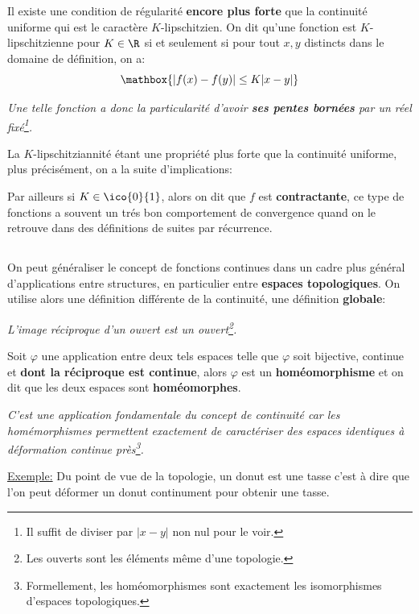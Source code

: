 Il existe une condition de régularité \textbf{encore plus forte} que la continuité uniforme qui est le caractère \(K\)-lipschitzien. On dit qu'une fonction est \(K\)-lipschitzienne pour \(K \in \R\) si et seulement si pour tout \(x, y\) distincts dans le domaine de définition, on a:
\[
   \mathbox{|f(x) - f(y)| \leq K|x - y|}   
\]
\begin{center}
   \textit{
      Une telle fonction a donc la particularité d'avoir \textbf{ses pentes bornées} par un réel fixé\footnote[1]{Il suffit de diviser par \(|x - y|\) non nul pour le voir.}.
   }
\end{center}
La \(K\)-lipschitziannité étant une propriété plus forte que la continuité uniforme, plus précisément, on a la suite d'implications:
\begin{center}
\end{center}
Par ailleurs si \(K \in \ico{0}{1}\), alors on dit que \(f\) est \textbf{contractante}, ce type de fonctions a souvent un trés bon comportement de convergence quand on le retrouve dans des définitions de suites par récurrence.

\subsection*{}

On peut généraliser le concept de fonctions continues dans un cadre plus général d'applications entre structures, en particulier entre \textbf{espaces topologiques}. On utilise alors une définition différente de la continuité, une définition \textbf{globale}:
\begin{center}
   \textit{L'image réciproque d'un ouvert est un ouvert\footnote[2]{Les ouverts sont les éléments même d'une topologie.}.}
\end{center}

Soit \(\varphi\) une application entre deux tels espaces telle que \(\varphi\) soit bijective, continue et \textbf{dont la réciproque est continue}, alors \(\varphi\) est un \textbf{homéomorphisme} et on dit que les deux espaces sont \textbf{homéomorphes}.
\begin{center}
   \textit{
      C'est une application fondamentale du concept de continuité car les homémorphismes permettent exactement de caractériser des espaces identiques à déformation continue près\footnote[3]{Formellement, les homéomorphismes sont exactement les isomorphismes d'espaces topologiques.}.
   }
\end{center}
\underline{Exemple:} Du point de vue de la topologie, un donut est une tasse c'est à dire que l'on peut déformer un donut continument pour obtenir une tasse.

